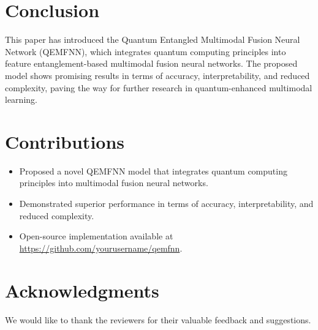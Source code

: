 \documentclass[12pt]{article}
\begin{document}
\section{Conclusion}
This paper has introduced the Quantum Entangled Multimodal Fusion Neural Network (QEMFNN), which integrates quantum computing principles into feature entanglement-based multimodal fusion neural networks. The proposed model shows promising results in terms of accuracy, interpretability, and reduced complexity, paving the way for further research in quantum-enhanced multimodal learning.

\section{Contributions}
\begin{itemize}
    \item Proposed a novel QEMFNN model that integrates quantum computing principles into multimodal fusion neural networks.
    \item Demonstrated superior performance in terms of accuracy, interpretability, and reduced complexity.
    \item Open-source implementation available at \url{https://github.com/yourusername/qemfnn}.
\end{itemize}

\section*{Acknowledgments}
We would like to thank the reviewers for their valuable feedback and suggestions.



\end{document}
